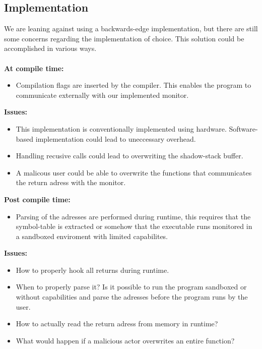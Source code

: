 \documentclass[11pt]{article}
\begin{document}
\subsection*{Implementation}
We are leaning against using a backwards-edge implementation, but there are still some concerns regarding the implementation of choice. This solution could be accomplished in various ways. \\
\\
\textbf{At compile time:}   
\begin{itemize}
    \item Compilation flags are inserted by the compiler. This enables the program to communicate externally with our implemented monitor.
\end{itemize}
\textbf{Issues:}  
\begin{itemize}
    \item This implementation is conventionally implemented using hardware. Software-based implementation could lead to uneccessary overhead.
    \item Handling recusive calls could lead to overwriting the shadow-stack buffer.
    \item A malicous user could be able to overwrite the functions that communicates the return adress with the monitor.
\end{itemize}
\textbf{Post compile time:} 
\begin{itemize}
    \item Parsing of the adresses are performed during runtime, this requires that the symbol-table is extracted or somehow that the executable runs monitored in a sandboxed enviroment with limited capabilites.  
\end{itemize}
\textbf{Issues:}  
\begin{itemize}
    \item How to properly hook all returns during runtime.
    \item When to properly parse it? Is it possible to run the program sandboxed or without capabilities and parse the adresses before the program runs by the user.
    \item How to actually read the return adress from memory in runtime?
    \item What would happen if a malicious actor overwrites an entire function?
\end{itemize}
\end{document}
